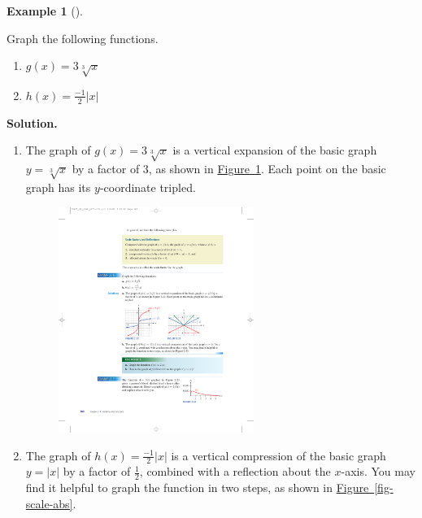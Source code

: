 \documentclass[10pt,]{book}
\theoremstyle{plain}
\theoremstyle{definition}
\theoremstyle{definition}
\theoremstyle{definition}
\newtheorem{example}[theorem]{Example}
\theoremstyle{definition}
\theoremstyle{definition}
\numberwithin{equation}{section}
\newcommand\abs[1]{\left|#1\right|}
\begin{document}
%
\begin{example}[]\label{example-scale}

        Graph the following functions.
        \leavevmode%
\begin{enumerate}[label=*\alph**]
\item\hypertarget{li-311}{}\(g(x) = 3\sqrt[3]{x}\)\item\hypertarget{li-312}{}\(h(x) =\frac{−1}{2}\abs{x}\)\end{enumerate}

\par\medskip\noindent%
\textbf{Solution.}\quad \leavevmode%
\begin{enumerate}[label=*\alph**]
\item\hypertarget{li-313}{}The graph of \(g(x) = 3\sqrt[3]{x}\) is a vertical expansion of the basic graph \(y = \sqrt[3]{x}\) by a factor of \(3\), as shown in \hyperref[fig-scale-cube-root]{Figure~\ref{fig-scale-cube-root}}. Each point on the basic graph has its \(y\)-coordinate tripled.
            \leavevmode%
\begin{figure}
\centering
\includegraphics[width=0.60\textwidth,]{images/fig-scale-cube-root.pdf}\caption{\label{fig-scale-cube-root}}
\end{figure}
\item\hypertarget{li-314}{}
            The graph of \(h(x) = \frac{−1}{2}\abs{x}\) is a vertical compression of the basic graph \(y = \abs{x}\) by a factor of \(\frac{1}{2}\), combined with a reflection about the \(x\)-axis. You may find it helpful to graph the function in two steps, as shown in \hyperref[fig-scale-abs]{Figure~\ref{fig-scale-abs}}.
            \leavevmode%
\begin{figure}

\end{figure}
\end{enumerate}
\end{example}
\end{document}
